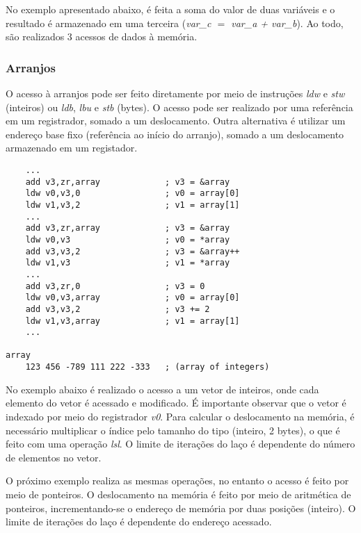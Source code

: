 \documentclass[11pt,a4paper]{report}
\begin{document}
No exemplo apresentado abaixo, é feita a soma do valor de duas variáveis
e o resultado é armazenado em uma terceira (\textit{var\_c $=$ var\_a +
var\_b}). Ao todo, são realizados 3 acessos de dados à memória.



\subsubsection{Arranjos}

O acesso à arranjos pode ser feito diretamente por meio de instruções
\textit{ldw} e \textit{stw} (inteiros) ou \textit{ldb}, \textit{lbu} e
\textit{stb} (bytes). O acesso pode ser realizado por uma referência
em um registrador, somado a um deslocamento. Outra alternativa é utilizar
um endereço base fixo (referência ao início do arranjo), somado a um
deslocamento armazenado em um registador.

\begin{verbatim}
    ...
    add v3,zr,array             ; v3 = &array
    ldw v0,v3,0                 ; v0 = array[0]
    ldw v1,v3,2                 ; v1 = array[1]
    ...
    add v3,zr,array             ; v3 = &array
    ldw v0,v3                   ; v0 = *array
    add v3,v3,2                 ; v3 = &array++
    ldw v1,v3                   ; v1 = *array
    ...
    add v3,zr,0                 ; v3 = 0
    ldw v0,v3,array             ; v0 = array[0]
    add v3,v3,2                 ; v3 += 2
    ldw v1,v3,array             ; v1 = array[1]
    ...

array
    123 456 -789 111 222 -333   ; (array of integers)
\end{verbatim}

No exemplo abaixo é realizado o acesso a um vetor de inteiros, onde
cada elemento do vetor é acessado e modificado. É importante observar
que o vetor é indexado por meio do registrador \textit{v0}. Para
calcular o deslocamento na memória, é necessário multiplicar o índice
pelo tamanho do tipo (inteiro, 2 bytes), o que é feito com uma operação
\textit{lsl}. O limite de iterações do laço é dependente do número
de elementos no vetor.



O próximo exemplo realiza as mesmas operações, no entanto o acesso é
feito por meio de ponteiros. O deslocamento na memória é feito por meio
de aritmética de ponteiros, incrementando-se o endereço de memória por
duas posições (inteiro). O limite de iterações do laço é dependente do
endereço acessado.
\end{document}
